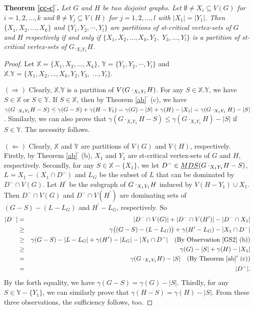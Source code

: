 \documentclass[a4paper,11pt]{article}
\numberwithin{equation}{section}
\begin{document}
\noindent\textbf{Theorem \ref{cc-c}$^\prime$.}
\emph{Let $G$ and $H$ be two disjoint graphs.} \emph{Let $\emptyset\neq X_i\subseteq V(G)$ for $i=1,2,\ldots,k$ and $\emptyset\neq Y_j\subseteq V(H)$ for $j=1,2,\ldots,l$ with $|X_1|=|Y_1|$. Then
 $\{X_1, X_2,\ldots, X_k\}$ and $\{Y_1, Y_2,\cdots, Y_l\}$ are partitions of st-critical vertex-sets of $G$ and $H$ respectively if and only if $\{X_1, X_2,\ldots, X_k,Y_2,$ $Y_3,\ldots, Y_l\}$ is a partition of st-critical vertex-sets of $G._{X_1Y_1}H$.}
\begin{proof}
Let $\mathbb{X}=\{X_1, X_2,\ldots, X_k\}$, $\mathbb{Y}=\{Y_1, Y_2,\cdots, Y_l\}$ and $\mathbb{X}.\mathbb{Y}=\{X_1, X_2,\ldots, X_k,Y_2, Y_3,$ $\ldots, Y_l\}$.

$(\Rightarrow)$ Clearly, $\mathbb{X}.\mathbb{Y}$ is a partition of $V(G\cdot_{X_1Y_1}\negmedspace H)$. For any $S\in \mathbb{X}.\mathbb{Y}$, we have $S\in \mathbb{X}$ or $S\in\mathbb{Y}$. If $S\in \mathbb{X}$, then by Theorem \ref{ab}$^\prime$ (c), we have
 $\gamma(G\cdot_{X_1Y_1}\negmedspace{H}-S)\leq\gamma(G-S)+\gamma(H-Y_1)=\gamma(G)-|S|+\gamma(H)-|X_1|=\gamma(G\cdot_{X_1Y_1}H)-|S|$. Similarly, we can also prove that $\gamma(G\cdot_{X_1Y_1}H-S)\leq \gamma(G\cdot_{X_1Y_1}H)-|S|$ if $S\in \mathbb{Y}$. The necessity follows.

$(\Leftarrow)$ Clearly,  $\mathbb{X}$ and $\mathbb{Y}$ are partitions of $V(G)$ and $V(H)$, respectively. Firstly, by Theorem \ref{ab}$^\prime$ (b), $X_1$ and $Y_1$ are st-critical vertex-sets of $G$ and $H$, respectively. Secondly, for any $S\in \mathbb{X}-\{X_1\}$, we let $D^{-}\in \underline{MDS}(G\cdot_{X_1Y_1}\negmedspace{H}-S)$, $L=X_1-(X_1\cap D^{-})$ and $L_G$ be the subset of $L$ that can be dominated by $D^{-}\cap V(G)$. Let $H^{\prime}$ be the subgraph of $G\cdot_{X_1Y_1}\negmedspace H$ induced by $V(H-Y_1)\cup X_1$. Then $D^{-}\cap V(G)$ and $D^{-}\cap V(H^\prime)$ are dominating sets of $(G-S)-(L-L_G)$ and $H^\prime-L_G$, respectively. So
\begin{eqnarray*}
|D^{-}| & = & |D^{-}\cap V(G)|+|D^{-}\cap V(H^\prime)|-|D^{-}\cap X_1| \\
& \geq & \gamma\big((G-S)-(L-L_G)\big)+\gamma(H^\prime-L_G)-|X_1\cap D^{-}|  \\
& \geq & \gamma(G-S)-|L-L_G|+\gamma(H^\prime)-|L_G|-|X_1\cap D^{-}|~~~(\text{By~Observation \ref{GS2} (b)})\\
& \geq & \gamma(G)-|S|+\gamma(H)-|X_1| \\
& = & \gamma(G\cdot_{X_1Y_1}\negmedspace H)-|S|~~~(\text{By~Theorem \ref{ab}$^\prime$ (c)})\\
& = & |D^{-}|.
\end{eqnarray*}
By the forth equality, we have $\gamma(G-S)=\gamma(G)-|S|$. Thirdly, for any $S\in \mathbb{Y}-\{Y_1\}$, we can similarly prove that $\gamma(H-S)=\gamma(H)-|S|$. From these three observations,  the sufficiency follows, too.
\end{proof}
\end{document}
